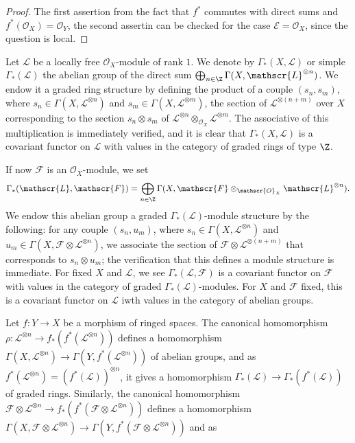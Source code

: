 \begin{proof}
The first assertion from the fact that $f^*$ commutes with direct sums and $f^*(\mathscr{O}_X)=\mathscr{O}_Y$, the second assertin can be checked for the case $\mathscr{E}=\mathscr{O}_X$, since the question is local.
\end{proof}
Let $\mathscr{L}$ be a locally free $\mathscr{O}_X$-module of rank $1$. We denote by $\Gamma_*(X,\mathscr{L})$ or simple $\Gamma_*(\mathscr{L})$ the abelian group of the direct sum $\bigoplus_{n\in\Z}\Gamma(X,\mathscr{L}^{\otimes n})$. We endow it a graded ring structure by defining the product of a couple $(s_n,s_m)$, where $s_n\in\Gamma(X,\mathscr{L}^{\otimes n})$ and $s_m\in\Gamma(X,\mathscr{L}^{\otimes m})$, the section of $\mathscr{L}^{\otimes(n+m)}$ over $X$ corresponding to the section $s_n\otimes s_m$ of $\mathscr{L}^{\otimes n}\otimes_{\mathscr{O}_X}\mathscr{L}^{\otimes m}$. The associative of this multiplication is immediately verified, and it is clear that $\Gamma_*(X,\mathscr{L})$ is a covariant functor on $\mathscr{L}$ with values in the category of graded rings of type $\Z$.\par
If now $\mathscr{F}$ is an $\mathscr{O}_X$-module, we set
\[\Gamma_*(\mathscr{L},\mathscr{F})=\bigoplus_{n\in\Z}\Gamma(X,\mathscr{F}\otimes_{\mathscr{O}_X}\mathscr{L}^{\otimes n}).\]
We endow this abelian group a graded $\Gamma_*(\mathscr{L})$-module structure by the following: for any couple $(s_n,u_m)$, where $s_n\in\Gamma(X,\mathscr{L}^{\otimes n})$ and $u_m\in\Gamma(X,\mathscr{F}\otimes\mathscr{L}^{\otimes n})$, we associate the section of $\mathscr{F}\otimes\mathscr{L}^{\otimes(n+m)}$ that corresponds to $s_n\otimes u_m$; the verification that this defines a module structure is immediate. For fixed $X$ and $\mathscr{L}$, we see $\Gamma_*(\mathscr{L},\mathscr{F})$ is a covariant functor on $\mathscr{F}$ with values in the category of graded $\Gamma_*(\mathscr{L})$-modules. For $X$ and $\mathscr{F}$ fixed, this is a covariant functor on $\mathscr{L}$ iwth values in the category of abelian groups.\par
Let $f:Y\to X$ be a morphism of ringed spaces. The canonical homomorphism $\rho:\mathscr{L}^{\otimes n}\to f_*(f^*(\mathscr{L}^{\otimes n}))$ defines a homomorphism $\Gamma(X,\mathscr{L}^{\otimes n})\to\Gamma(Y,f^*(\mathscr{L}^{\otimes n}))$ of abelian groups, and as $f^*(\mathscr{L}^{\otimes n})=(f^*(\mathscr{L}))^{\otimes n}$, it gives a homomorphism $\Gamma_*(\mathscr{L})\to\Gamma_*(f^*(\mathscr{L}))$ of graded rings. Similarly, the canonical homomorphism $\mathscr{F}\otimes\mathscr{L}^{\otimes n}\to f_*(f^*(\mathscr{F}\otimes\mathscr{L}^{\otimes n}))$ defines a homomorphism $\Gamma(X,\mathscr{F}\otimes\mathscr{L}^{\otimes n})\to\Gamma(Y,f^*(\mathscr{F}\otimes\mathscr{L}^{\otimes n}))$ and as
